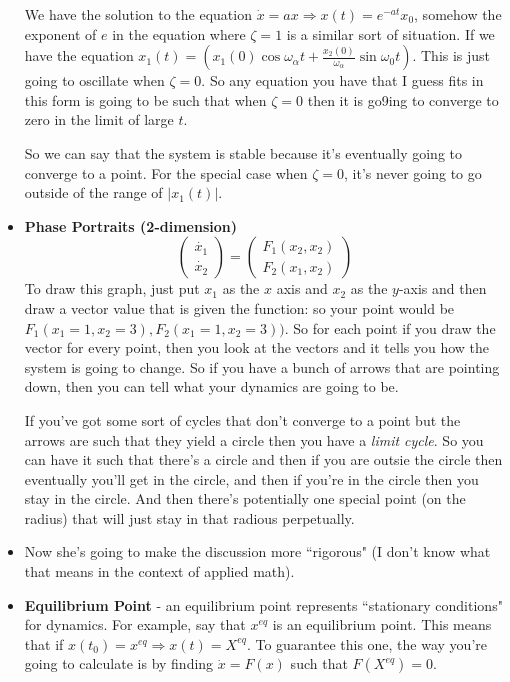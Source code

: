 \documentclass[12pt]{article}
\theoremstyle{definition}
\begin{document}
\begin{itemize}
    We have the solution to the equation $\dot{x} = ax \Rightarrow x(t) = e^{-at}x_0$, somehow the exponent of $e$ in the equation where $\zeta = 1$ is a similar sort of situation. If we have the equation $x_1(t) = (x_1(0) \cos\omega_\alpha t + \frac{x_2(0)}{\omega_\alpha} \sin \omega_0 t)$. This is just going to oscillate when $\zeta = 0$. So any equation you have that I guess fits in this form is going to be such that when $\zeta = 0$ then it is go9ing to converge to zero in the limit of large $t$.

    So we can say that the system is stable because it's eventually going to converge to a point. For the special case when $\zeta = 0$, it's never going to go outside of the range of $|x_1(t)|$.
    \item \textbf{Phase Portraits (2-dimension)}
    $$\begin{pmatrix} \dot{x_1} \\ \dot{x_2} \end{pmatrix} = \begin{pmatrix}F_1(x_2, x_2) \\ F_2(x_1, x_2) \end{pmatrix} $$
    To draw this graph, just put $x_1$ as the $x$ axis and $x_2$ as the $y$-axis and then draw a vector value that is given the function: so your point would be $F_1(x_1 = 1, x_2 = 3), F_2(x_1 = 1, x_2 = 3))$. So for each point if you draw the vector for every point, then you look at the vectors and it tells you how the system is going to change. So if you have a bunch of arrows that are pointing down, then you can tell what your dynamics are going to be.

    If you've got some sort of cycles that don't converge to a point but the arrows are such that they yield a circle then you have a \textit{limit cycle}. So you can have it such that there's a circle and then if you are outsie the circle then eventually you'll get in the circle, and then if you're in the circle then you stay in the circle. And then there's potentially one special point (on the radius) that will just stay in that radious perpetually.
    
    \item Now she's going to make the discussion more ``rigorous" (I don't know what that means in the context of applied math).
    \item \textbf{Equilibrium Point} - an equilibrium point represents  ``stationary conditions" for dynamics. For example, say that $x^{eq}$ is an equilibrium point. This means that if $x(t_0) = x^{eq} \Rightarrow x(t) = X^{eq}$. To guarantee this one, the way you're going to calculate is by finding $\dot{x} = F(x)$ such that $F(X^{eq}) = 0$. 


\end{itemize}
\end{document}

